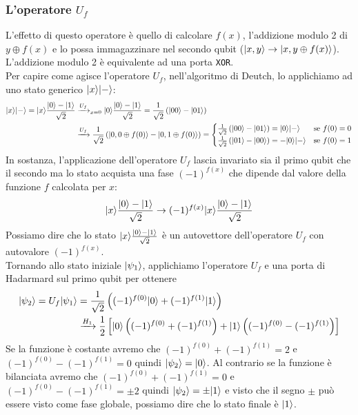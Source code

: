 \documentclass[12pt, a4paper]{report}
\begin{document}
\subsubsection{L'operatore $U_{f}$}
L'effetto di questo operatore è quello di calcolare $f(x)$, l'addizione modulo 2 di $y\oplus f(x)$ e lo possa immagazzinare nel secondo qubit ($| x,y \rangle\rightarrow| x,y\oplus f(x) \rangle$). L'addizione modulo 2 è equivalente ad una porta \texttt{XOR}.\\
Per capire come agisce l'operatore $U_{f}$, nell'algoritmo di Deutch, lo applichiamo ad uno stato generico $| x \rangle| - \rangle$:
\begin{equation*}
    \begin{split}
        | x \rangle| - \rangle = | x \rangle\frac{| 0 \rangle-| 1 \rangle}{\sqrt{2}} &\xrightarrow{U_{f}}_{x=0} | 0 \rangle\frac{| 0 \rangle-| 1 \rangle}{\sqrt{2}} = \frac{1}{\sqrt{2}}\left(| 00 \rangle-| 01 \rangle\right)\\
        &\xrightarrow{U_{f}} \frac{1}{\sqrt{2}}\left(| 0,0\oplus f(0) \rangle-| 0,1\oplus f(0) \rangle\right) = \begin{cases}
            \frac{1}{\sqrt{2}}\left(| 00 \rangle-| 01 \rangle\right) = | 0 \rangle| - \rangle & \text{se $f(0)=0$} \\
            \frac{1}{\sqrt{2}}\left(| 01 \rangle-| 00 \rangle\right) = -| 0 \rangle| - \rangle & \text{se $f(0)=1$}
        \end{cases}
    \end{split}
\end{equation*}
In sostanza, l'applicazione dell'operatore $U_{f}$ lascia invariato sia il primo qubit che il secondo ma lo stato acquista una fase $(-1)^{f(x)}$ che dipende dal  valore della funzione $f$ calcolata per $x$:
\begin{equation*}
    | x \rangle\frac{| 0 \rangle-| 1 \rangle}{\sqrt{2}}\rightarrow(-1)^{f(x)}| x \rangle\frac{| 0 \rangle-| 1 \rangle}{\sqrt{2}}
\end{equation*} 
Possiamo dire che lo stato $| x \rangle\frac{| 0 \rangle-| 1 \rangle}{\sqrt{2}}$ è un autovettore dell'operatore $U_{f}$ con autovalore $(-1)^{f(x)}$.\\
Tornando allo stato iniziale $| \psi_{1} \rangle$, applichiamo l'operatore $U_{f}$ e una porta di Hadarmard sul primo qubit per ottenere
\begin{equation*}
    \begin{split}
        | \psi_{2} \rangle = U_{f}| \psi_{1} \rangle &= \frac{1}{\sqrt{2}}\left((-1)^{f(0)}| 0 \rangle+(-1)^{f(1)}| 1 \rangle\right) \\ 
        &\xrightarrow{H_{1}} \frac{1}{2}\left[| 0 \rangle\left((-1)^{f(0)}+(-1)^{f(1)}\right)+| 1 \rangle\left((-1)^{f(0)}-(-1)^{f(1)}\right)\right]
    \end{split}
\end{equation*}
Se la funzione è costante avremo che $(-1)^{f(0)}+(-1)^{f(1)}=2$ e $(-1)^{f(0)}-(-1)^{f(1)}=0$ quindi $| \psi_{2} \rangle=| 0 \rangle$. Al contrario se la funzione è bilanciata avremo che $(-1)^{f(0)}+(-1)^{f(1)}=0$ e $(-1)^{f(0)}-(-1)^{f(1)}=\pm2$ quindi $| \psi_{2} \rangle=\pm| 1 \rangle$ e visto che il segno $\pm$ può essere visto come fase globale, possiamo dire che lo stato finale è $| 1 \rangle$.
\end{document}
